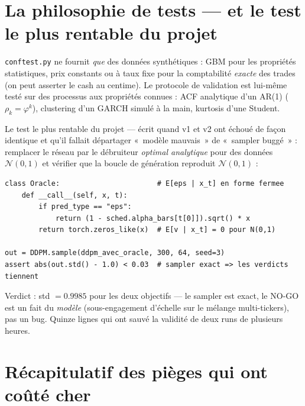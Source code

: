 \documentclass[11pt,a4paper]{article}
\newcommand{\code}[1]{\texttt{#1}}
\begin{document}
\section{La philosophie de tests --- et le test le plus rentable du projet}

\code{conftest.py} ne fournit \emph{que} des données synthétiques : GBM pour
les propriétés statistiques, prix constants ou à taux fixe pour la
comptabilité \emph{exacte} des trades (on peut asserter le cash au centime).
Le protocole de validation est lui-même testé sur des processus aux
propriétés connues : ACF analytique d'un AR(1) ($\rho_k = \varphi^k$),
clustering d'un GARCH simulé à la main, kurtosis d'une Student.

Le test le plus rentable du projet --- écrit quand v1 et v2 ont échoué de
façon identique et qu'il fallait départager «~modèle mauvais~» de «~sampler
buggé~» : remplacer le réseau par le débruiteur \emph{optimal analytique}
pour des données $\mathcal{N}(0,1)$ et vérifier que la boucle de génération
reproduit $\mathcal{N}(0,1)$ :

\begin{lstlisting}
class Oracle:                       # E[eps | x_t] en forme fermee
    def __call__(self, x, t):
        if pred_type == "eps":
            return (1 - sched.alpha_bars[t[0]]).sqrt() * x
        return torch.zeros_like(x)  # E[v | x_t] = 0 pour N(0,1)

out = DDPM.sample(ddpm_avec_oracle, 300, 64, seed=3)
assert abs(out.std() - 1.0) < 0.03  # sampler exact => les verdicts tiennent
\end{lstlisting}

Verdict : std $= 0.9985$ pour les deux objectifs --- le sampler est exact, le
NO-GO est un fait du \emph{modèle} (sous-engagement d'échelle sur le mélange
multi-tickers), pas un bug. Quinze lignes qui ont sauvé la validité de deux
runs de plusieurs heures.

\section{Récapitulatif des pièges qui ont coûté cher}
\end{document}
